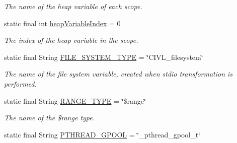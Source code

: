 \begin{DoxyCompactItemize}
\begin{DoxyCompactList}\small\item\em The name of the heap variable of each scope. \end{DoxyCompactList}\item 
\hypertarget{classedu_1_1udel_1_1cis_1_1vsl_1_1civl_1_1model_1_1IF_1_1ModelConfiguration_a0f6287844f79f83e00f3229182bdda6b}{}static final int \hyperlink{classedu_1_1udel_1_1cis_1_1vsl_1_1civl_1_1model_1_1IF_1_1ModelConfiguration_a0f6287844f79f83e00f3229182bdda6b}{heap\+Variable\+Index} = 0\label{classedu_1_1udel_1_1cis_1_1vsl_1_1civl_1_1model_1_1IF_1_1ModelConfiguration_a0f6287844f79f83e00f3229182bdda6b}

\begin{DoxyCompactList}\small\item\em The index of the heap variable in the scope. \end{DoxyCompactList}\item 
\hypertarget{classedu_1_1udel_1_1cis_1_1vsl_1_1civl_1_1model_1_1IF_1_1ModelConfiguration_a2ccf4975c77afec160023ac485423209}{}static final String \hyperlink{classedu_1_1udel_1_1cis_1_1vsl_1_1civl_1_1model_1_1IF_1_1ModelConfiguration_a2ccf4975c77afec160023ac485423209}{F\+I\+L\+E\+\_\+\+S\+Y\+S\+T\+E\+M\+\_\+\+T\+Y\+P\+E} = \char`\"{}C\+I\+V\+L\+\_\+filesystem\char`\"{}\label{classedu_1_1udel_1_1cis_1_1vsl_1_1civl_1_1model_1_1IF_1_1ModelConfiguration_a2ccf4975c77afec160023ac485423209}

\begin{DoxyCompactList}\small\item\em The name of the file system variable, created when stdio transformation is performed. \end{DoxyCompactList}\item 
\hypertarget{classedu_1_1udel_1_1cis_1_1vsl_1_1civl_1_1model_1_1IF_1_1ModelConfiguration_ab496a75b1ffcd34022d4eef055c97cd9}{}static final String \hyperlink{classedu_1_1udel_1_1cis_1_1vsl_1_1civl_1_1model_1_1IF_1_1ModelConfiguration_ab496a75b1ffcd34022d4eef055c97cd9}{R\+A\+N\+G\+E\+\_\+\+T\+Y\+P\+E} = \char`\"{}\$range\char`\"{}\label{classedu_1_1udel_1_1cis_1_1vsl_1_1civl_1_1model_1_1IF_1_1ModelConfiguration_ab496a75b1ffcd34022d4eef055c97cd9}

\begin{DoxyCompactList}\small\item\em The name of the \$range type. \end{DoxyCompactList}\item 
\hypertarget{classedu_1_1udel_1_1cis_1_1vsl_1_1civl_1_1model_1_1IF_1_1ModelConfiguration_a1fad0ba035722734ca23a28e8e181f2c}{}static final String \hyperlink{classedu_1_1udel_1_1cis_1_1vsl_1_1civl_1_1model_1_1IF_1_1ModelConfiguration_a1fad0ba035722734ca23a28e8e181f2c}{P\+T\+H\+R\+E\+A\+D\+\_\+\+G\+P\+O\+O\+L} = \char`\"{}\+\_\+pthread\+\_\+gpool\+\_\+t\char`\"{}\label{classedu_1_1udel_1_1cis_1_1vsl_1_1civl_1_1model_1_1IF_1_1ModelConfiguration_a1fad0ba035722734ca23a28e8e181f2c}


\end{DoxyCompactItemize}
